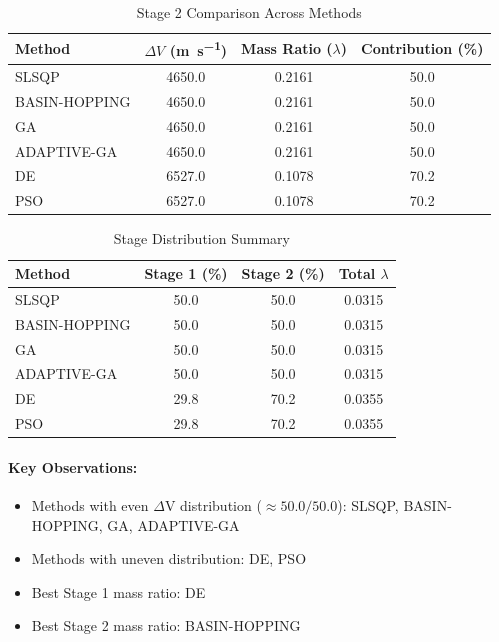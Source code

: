 \documentclass{article}
\begin{document}
\begin{table}[H]
\centering
\caption{Stage 2 Comparison Across Methods}
\begin{tabular}{lS[table-format=4.1]S[table-format=1.4]S[table-format=3.1]}
\toprule
Method & {$\Delta V$ (\si{\meter\per\second})} & {Mass Ratio ($\lambda$)} & {Contribution (\%)} \\
\midrule
SLSQP        & 4650.0 & 0.2161 & 50.0 \\
BASIN-HOPPING & 4650.0 & 0.2161 & 50.0 \\
GA           & 4650.0 & 0.2161 & 50.0 \\
ADAPTIVE-GA  & 4650.0 & 0.2161 & 50.0 \\
DE           & 6527.0 & 0.1078 & 70.2 \\
PSO          & 6527.0 & 0.1078 & 70.2 \\
\bottomrule
\end{tabular}
\end{table}

\begin{table}[H]
\centering
\caption{Stage Distribution Summary}
\begin{tabular}{lS[table-format=4.1]S[table-format=4.1]S[table-format=1.4]}
\toprule
Method & {Stage 1 (\%)} & {Stage 2 (\%)} & {Total $\lambda$} \\
\midrule
SLSQP        & 50.0 & 50.0 & 0.0315 \\
BASIN-HOPPING & 50.0 & 50.0 & 0.0315 \\
GA           & 50.0 & 50.0 & 0.0315 \\
ADAPTIVE-GA  & 50.0 & 50.0 & 0.0315 \\
DE           & 29.8 & 70.2 & 0.0355 \\
PSO          & 29.8 & 70.2 & 0.0355 \\
\bottomrule
\end{tabular}
\end{table}

\paragraph{Key Observations:}
\begin{itemize}
\item Methods with even $\Delta$V distribution ($\approx50.0/50.0$): SLSQP, BASIN-HOPPING, GA, ADAPTIVE-GA
\item Methods with uneven distribution: DE, PSO
\item Best Stage 1 mass ratio: DE
\item Best Stage 2 mass ratio: BASIN-HOPPING
\end{itemize}
\end{document}
